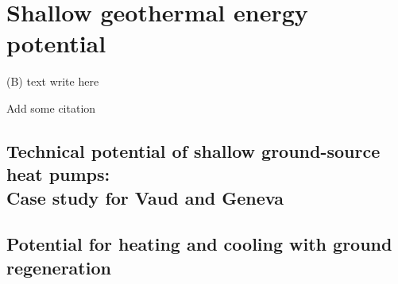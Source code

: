 \chapter{Shallow geothermal energy potential}
\label{geothermal}

\vspace{-15pt}
\begin{tcolorbox}[enhanced,width=\textwidth,size=fbox,
        sharp corners,colframe=black!5!white,drop fuzzy shadow southeast] %
(B) text write here

Add some citation
\end{tcolorbox}

\section{Technical potential of shallow ground-source heat pumps: \\Case study for Vaud and Geneva}


\section{Potential for heating and cooling with ground regeneration}